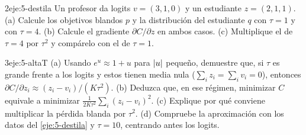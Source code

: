 \begin{ejercicio}{2}{eje:5-destila}
Un profesor da logits $v=(3,1,0)$ y un estudiante $z=(2,1,1)$. (a) Calcule los objetivos blandos $p$ y la distribución del estudiante $q$ con $\tau=1$ y con $\tau=4$. (b) Calcule el gradiente $\partial C/\partial z$ en ambos casos. (c) Multiplique el de $\tau=4$ por $\tau^{2}$ y compárelo con el de $\tau=1$.
\end{ejercicio}

\begin{ejercicio}{3}{eje:5-altaT}
(a) Usando $e^{u}\approx 1+u$ para $\lvert u\rvert$ pequeño, demuestre que, si $\tau$ es grande frente a los logits y estos tienen media nula ($\sum_i z_i=\sum_i v_i=0$), entonces $\partial C/\partial z_i\approx(z_i-v_i)/(K\tau^{2})$. (b) Deduzca que, en ese régimen, minimizar $C$ equivale a minimizar $\frac{1}{2K\tau^{2}}\sum_i(z_i-v_i)^{2}$. (c) Explique por qué conviene multiplicar la pérdida blanda por $\tau^{2}$. (d) Compruebe la aproximación con los datos del \cref{eje:5-destila} y $\tau=10$, centrando antes los logits.
\end{ejercicio}
